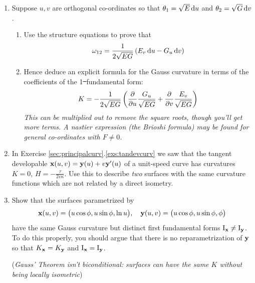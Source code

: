 \begin{exercises}{}{}
\begin{enumerate}
  
  	\item\label{exs:gausscurvline} Suppose $u,v$ are orthogonal co-ordinates so that $\theta_1=\sqrt E\,{\mathrm{d} u}$ and $\theta_2=\sqrt G\,{\mathrm{d} v}$.
  	\begin{enumerate}
    	\item Use the structure equations to prove that
    	\[
    		\omega_{12}= \frac 1{2\sqrt{EG}}\left(E_v\,{\mathrm{d} u} -G_u\,{\mathrm{d} v}\right)
    	\]
    	\item Hence deduce an explicit formula for the Gauss curvature in terms of the coefficients of the 1\st\ fundamental form:
  		\[
  			K=-\frac 1{2\sqrt{EG}}\left(\frac{\partial }{\partial u}\frac{G_u}{\sqrt{EG}}+\frac{\partial }{\partial v}\frac{E_v}{\sqrt{EG}}\right)
  		\]
			\emph{This can be multiplied out to remove the square roots, though you'll get more terms. A nastier expression (the Brioshi formula) may be found for general co-ordinates with $F\neq 0$.}
		\end{enumerate}
  
  
  
  	\item\label{exs:tandevkh} In Exercise \ref*{sec:principalcurv}.\ref{exs:tandevcurv} we saw that the tangent developable ${\mathbf{x}}(u,v)={\mathbf{y}}(u)+v{\mathbf{y}}'(u)$ of a unit-speed curve has curvatures $K=0$, $H=-\frac\tau{2v\kappa}$. Use this to describe \emph{two} surfaces with the same curvature functions which are not related by a direct isometry.
  
        
  	\item Show that the surfaces parametrized by
  	\[
  		{\mathbf{x}}(u,v)=\bigl(u\cos\phi,u\sin\phi,\ln u\bigr),\quad {\mathbf{y}}(u,v)=\bigl(u\cos\phi,u\sin\phi,\phi\bigr)
  	\]
  	have the same Gauss curvature but distinct first fundamental forms $\mathrm{I}_{\mathbf{x}}\neq\mathrm{I}_{\mathbf{y}}$. To do this properly, you should argue that there is no reparametrization of ${\mathbf{y}}$ so that $K_{\mathbf{x}}=K_{\mathbf{y}}$ and $\mathrm{I}_{\mathbf{x}}=\mathrm{I}_{\mathbf{y}}$.\par
  	(\emph{Gauss' Theorem isn't biconditional: surfaces can have the same $K$ without being locally isometric})
  

\end{enumerate}
\end{exercises}
